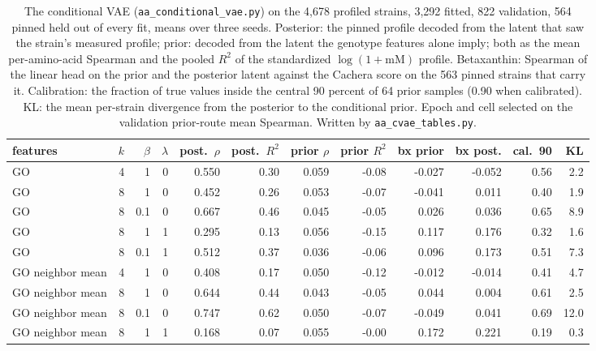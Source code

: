 \begin{table}[H]
  \centering
  \footnotesize
  \caption[The conditional VAE on the profile: posterior route against prior route]{The conditional VAE (\texttt{aa\_conditional\_vae.py}) on the 4,678 profiled strains, 3,292 fitted, 822 validation, 564 pinned held out of every fit, means over three seeds. Posterior: the pinned profile decoded from the latent that saw the strain's measured profile; prior: decoded from the latent the genotype features alone imply; both as the mean per-amino-acid Spearman and the pooled $R^2$ of the standardized $\log(1+\text{mM})$ profile. Betaxanthin: Spearman of the linear head on the prior and the posterior latent against the Cachera score on the 563 pinned strains that carry it. Calibration: the fraction of true values inside the central 90 percent of 64 prior samples (0.90 when calibrated). KL: the mean per-strain divergence from the posterior to the conditional prior. Epoch and cell selected on the validation prior-route mean Spearman. Written by \texttt{aa\_cvae\_tables.py}.}
  \label{tab:aa-cvae}
  \begin{tabular}{@{}lrrrrrrrrrrr@{}}
    \hline
    features & $k$ & $\beta$ & $\lambda$ & post.\ $\rho$ & post.\ $R^2$ & prior $\rho$ & prior $R^2$ & bx prior & bx post. & cal.\ 90 & KL \\
    \hline
    GO & 4 & 1 & 0 & 0.550 & 0.30 & 0.059 & -0.08 & -0.027 & -0.052 & 0.56 & 2.2 \\
    GO & 8 & 1 & 0 & 0.452 & 0.26 & 0.053 & -0.07 & -0.041 & 0.011 & 0.40 & 1.9 \\
    GO & 8 & 0.1 & 0 & 0.667 & 0.46 & 0.045 & -0.05 & 0.026 & 0.036 & 0.65 & 8.9 \\
    GO & 8 & 1 & 1 & 0.295 & 0.13 & 0.056 & -0.15 & 0.117 & 0.176 & 0.32 & 1.6 \\
    GO & 8 & 0.1 & 1 & 0.512 & 0.37 & 0.036 & -0.06 & 0.096 & 0.173 & 0.51 & 7.3 \\
    GO neighbor mean & 4 & 1 & 0 & 0.408 & 0.17 & 0.050 & -0.12 & -0.012 & -0.014 & 0.41 & 4.7 \\
    GO neighbor mean & 8 & 1 & 0 & 0.644 & 0.44 & 0.043 & -0.05 & 0.044 & 0.004 & 0.61 & 2.5 \\
    GO neighbor mean & 8 & 0.1 & 0 & 0.747 & 0.62 & 0.050 & -0.07 & -0.049 & 0.041 & 0.69 & 12.0 \\
    GO neighbor mean & 8 & 1 & 1 & 0.168 & 0.07 & 0.055 & -0.00 & 0.172 & 0.221 & 0.19 & 0.3 \\

\end{tabular}
\end{table}
